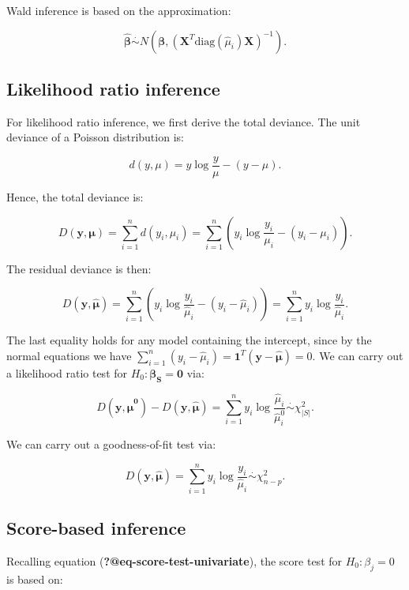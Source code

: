 \documentclass[
  11pt,
  letterpaper,
  oneside]{book}
\theoremstyle{plain}
\theoremstyle{plain}
\theoremstyle{definition}
\theoremstyle{plain}
\theoremstyle{definition}
\theoremstyle{remark}
\begin{document}
Wald inference is based on the approximation:

\[
\boldsymbol{\hat \beta} \overset \cdot \sim N(\boldsymbol{\beta}, (\boldsymbol{X}^T \text{diag}(\hat \mu_i)\boldsymbol{X})^{-1}).
\]

\hypertarget{sec-likelihood-ratio-inference}{%
\subsection{Likelihood ratio
inference}\label{sec-likelihood-ratio-inference}}

For likelihood ratio inference, we first derive the total deviance. The
unit deviance of a Poisson distribution is:

\[
d(y, \mu) = y \log \frac{y}{\mu} - (y - \mu).
\]

Hence, the total deviance is:

\[
D(\boldsymbol{y}, \boldsymbol{\mu}) = \sum_{i = 1}^n d(y_i, \mu_i) = \sum_{i = 1}^n \left(y_i \log \frac{y_i}{\mu_i} - (y_i - \mu_i)\right).
\]

The residual deviance is then:

\[
D(\boldsymbol{y}, \boldsymbol{\hat\mu}) = \sum_{i = 1}^n \left(y_i \log \frac{y_i}{\hat \mu_i} - (y_i - \hat \mu_i)\right) = \sum_{i = 1}^n y_i \log \frac{y_i}{\hat \mu_i}.
\]

The last equality holds for any model containing the intercept, since by
the normal equations we have
\(\sum_{i = 1}^n (y_i - \hat \mu_i) = \boldsymbol{1}^T (\boldsymbol{y} - \boldsymbol{\hat \mu}) = 0\).
We can carry out a likelihood ratio test for
\(H_0: \boldsymbol{\beta_S} = \boldsymbol{0}\) via:

\[
D(\boldsymbol{y}, \boldsymbol{\hat \mu^0}) - D(\boldsymbol{y}, \boldsymbol{\hat \mu}) = \sum_{i = 1}^n y_i \log \frac{\hat \mu_i}{\hat \mu^0_{i}} \overset{\cdot}\sim \chi^2_{|S|}.
\]

We can carry out a goodness-of-fit test via:

\[
D(\boldsymbol{y}, \boldsymbol{\hat\mu}) = \sum_{i = 1}^n y_i \log \frac{y_i}{\hat \mu_i} \overset{\cdot}\sim \chi^2_{n - p}.
\]

\hypertarget{sec-score-based-inference}{%
\subsection{Score-based inference}\label{sec-score-based-inference}}

Recalling equation (\textbf{?@eq-score-test-univariate}), the score test
for \(H_0: \beta_j = 0\) is based on:
\end{document}
